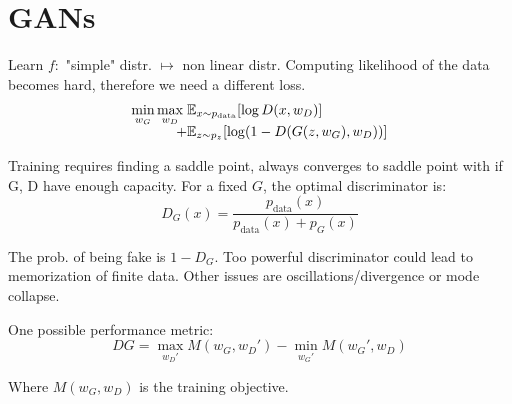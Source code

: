\section*{GANs}

Learn $f:$ "simple" distr. $\mapsto$ non linear distr. Computing likelihood of the data becomes hard, therefore we need a different loss.
\begin{align*}
	\min_{w_G} \max_{w_D} \; & \mathbb{E}_{x \sim p_{\text{data}}} [\log D(x, w_D)] \\[-5pt]
 	+ &\mathbb{E}_{z \sim p_z} [\log (1 - D(G(z, w_G), w_D))]
\end{align*}
 
 Training requires finding a saddle point, always converges to saddle point with if G, D have enough capacity. For a fixed $G$, the optimal discriminator is:
 $$D_G(x) = \frac{p_{\text{data}}(x)}{p_{\text{data}}(x) + p_G(x)}$$
 
The prob. of being fake is $1 - D_G$. Too powerful discriminator could lead to memorization of finite data. Other issues are oscillations/divergence or mode collapse. \smallskip
 
One possible performance metric:
$$DG = \max_{w_D'} M(w_G, w_D') - \min_{w_G'} M(w_G', w_D)$$
 
Where $M(w_G, w_D)$ is the training objective.
